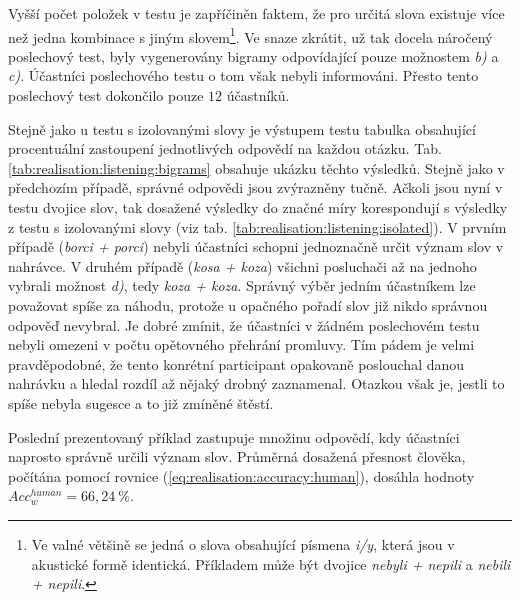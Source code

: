 Vyšší počet položek v testu je zapříčiněn faktem, že pro určitá slova existuje více než jedna kombinace s jiným slovem\footnote{Ve valné většině se jedná o slova obsahující písmena \textit{i/y}, která jsou v akustické formě identická. Příkladem může být dvojice \textit{nebyli + nepili} a \textit{nebili + nepili}.}. Ve snaze zkrátit, už tak docela náročený poslechový test, byly vygenerovány bigramy odpovídající pouze možnostem \textit{b)} a \textit{c)}. Účastníci poslechového testu o tom však nebyli informováni. Přesto tento poslechový test dokončilo pouze $12$ účastníků.

Stejně jako u testu s izolovanými slovy je výstupem testu tabulka obsahující procentuální zastoupení jednotlivých odpovědí na každou otázku. Tab. \ref{tab:realisation:listening:bigrams} obsahuje ukázku těchto výsledků. Stejně jako v předchozím případě, správné odpovědi jsou zvýrazněny tučně. Ačkoli jsou nyní v testu dvojice slov, tak dosažené výsledky do značné míry korespondují s výsledky z testu s izolovanými slovy (viz tab. \ref{tab:realisation:listening:isolated}). V prvním případě (\textit{borci + porci}) nebyli účastníci schopni jednoznačně určit význam slov v nahrávce. V druhém případě (\textit{kosa + koza}) všichni posluchači až na jednoho vybrali možnost \textit{d)}, tedy \textit{koza + koza}. Správný výběr jedním účastníkem lze považovat spíše za náhodu, protože u opačného pořadí slov již nikdo správnou odpověď nevybral. Je dobré zmínit, že účastníci v žádném poslechovém testu nebyli omezeni v počtu opětovného přehrání promluvy. Tím pádem je velmi pravděpodobné, že tento konrétní participant opakovaně poslouchal danou nahrávku a hledal rozdíl až nějaký drobný zaznamenal. Otazkou však je, jestli to spíše nebyla sugesce a to již zmíněné štěstí.

Poslední prezentovaný příklad zastupuje množinu odpovědí, kdy účastníci naprosto správně určili význam slov. Průměrná dosažená přesnost člověka, počítána pomocí rovnice (\ref{eq:realisation:accuracy:human}), dosáhla hodnoty $Acc_{w}^{human} = 66,24\ \%$.

